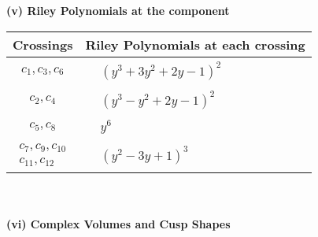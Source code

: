 \documentclass[1p]{elsarticle_modified}
\theoremstyle{definition}
\begin{document}
\newpage\renewcommand{\arraystretch}{1}
\flushleft \textbf{(v) Riley Polynomials at the component}\newline \\
\begin{tabular}{m{50pt}|m{274pt}}
Crossings & \hspace{64pt}Riley Polynomials at each crossing \\
\hline $$\begin{aligned}c_{1},c_{3},c_{6}\end{aligned}$$&$\begin{aligned}
&(y^3+3 y^2+2 y-1)^2
\end{aligned}$\\
\hline $$\begin{aligned}c_{2},c_{4}\end{aligned}$$&$\begin{aligned}
&(y^3- y^2+2 y-1)^2
\end{aligned}$\\
\hline $$\begin{aligned}c_{5},c_{8}\end{aligned}$$&$\begin{aligned}
&y^6
\end{aligned}$\\
\hline $$\begin{aligned}c_{7},c_{9},c_{10}\\c_{11},c_{12}\end{aligned}$$&$\begin{aligned}
&(y^2-3 y+1)^3
\end{aligned}$\\
\hline
\end{tabular}\\~\\
\newpage\flushleft \textbf{(vi) Complex Volumes and Cusp Shapes}
\end{document}
